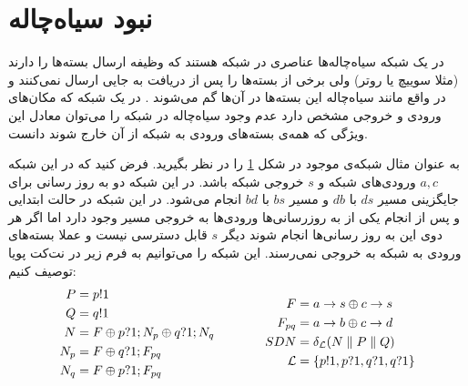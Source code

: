 \section{نبود سیاه‌چاله}
در یک شبکه سیاه‌چاله‌ها%
عناصری در شبکه هستند که وظیفه ارسال بسته‌ها را دارند
(مثلا سوییچ‌ یا روتر)
ولی برخی از بسته‌ها را پس از دریافت به جایی ارسال نمی‌کنند و در واقع مانند سیاه‌چاله این بسته‌ها در آن‌ها گم می‌شوند
\cite{network-abstractions}.
در یک شبکه که مکان‌های ورودی و خروجی مشخص دارد عدم وجود سیاه‌چاله در شبکه را می‌توان معادل این ويژگی که همه‌ی بسته‌های ورودی به شبکه از آن خارج شوند دانست.
\begin{figure}
    \centering
    \caption{ }
    \label{fig:blackhole}
\end{figure}
به عنوان مثال شبکه‌ی موجود در شکل
\ref{fig:blackhole}
را در نظر بگیرید.
فرض کنید که در این شبکه
$a,c$
ورودی‌های شبکه و
$s$
خروجی شبکه باشد.
در این شبکه دو به روز رسانی برای جایگزینی
مسیر
$ds$
با
$db$
و مسیر
$bs$
با
$bd$
انجام می‌شود.
در این شبکه در حالت ابتدایی و پس از انجام یکی از به روز‌رسانی‌ها ورودی‌ها به خروجی مسیر وجود دارد اما اگر هر دوی این به روز رسانی‌ها انجام شوند دیگر
$s$
قابل دسترسی نیست و عملا بسته‌های ورودی به شبکه به خروجی نمی‌رسند.
این شبکه را می‌توانیم به فرم زیر در نت‌کت پویا توصیف کنیم:
\begin{equation*}
    \begin{aligned}[c]
        P   & = p!1                             \\
        Q   & = q!1                             \\
        N   & = F \oplus p?1;N_p \oplus q?1;N_q \\
        N_p & = F \oplus q?1;F_{pq}             \\
        N_q & = F \oplus p?1;F_{pq}
    \end{aligned}
    \qquad\qquad
    \begin{aligned}[c]
        F           & = a\rightarrow s \oplus c\rightarrow s            \\
        F_{pq}      & = a\rightarrow b \oplus c\rightarrow d            \\
        SDN         & = \delta_{\mathcal{L}} (N
        \parallel P \parallel Q)                \\
        \mathcal{L} & = \{p!1,p?1,q?1,q?1\}
    \end{aligned}
\end{equation*}
